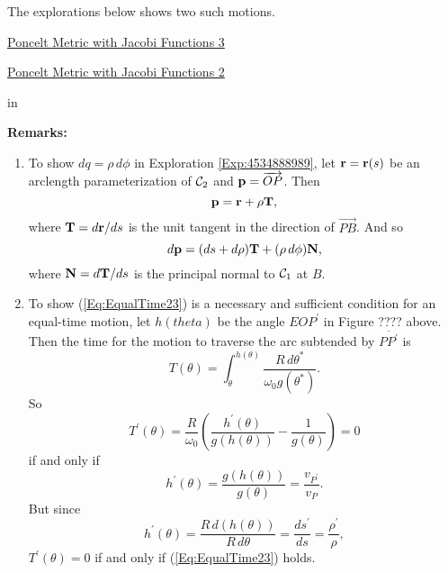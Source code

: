 \documentclass{ximera}
\newcommand{\pskip}{\vskip 0.1 in}
\begin{document}
The explorations below shows two such motions.

\begin{exploration}
\begin{onlineOnly}
    \begin{center}
\end{center}
\end{onlineOnly}

\href{https://www.desmos.com/calculator/l7oadgwyva}{Poncelt Metric with Jacobi Functions 3} %
\end{exploration}


\begin{exploration}
\begin{onlineOnly}
    \begin{center}
\end{center}
\end{onlineOnly}

\href{https://www.desmos.com/calculator/hm5zop04ob}{Poncelt Metric with Jacobi Functions 2}
\end{exploration}

\pskip

{\bf Remarks:}
\begin{enumerate}
\item To show $dq = \rho \, d\phi$ in Exploration \ref{Exp:4534888989}, let ${\bf r} = {\bf r}(s)$ be an arclength parameterization of ${\cal C}_2$ and ${\bf p} = \overrightarrow{OP}$. Then 
\[
  {\bf p} = {\bf r} + \rho {\bf T} ,
\]
where ${\bf T} = d{\bf r}/ds$ is the unit tangent in the direction of $\overrightarrow{PB}$. And so
\[
  d  {\bf p} = (ds + d\rho){\bf T} + (\rho \, d\phi) {\bf N} , 
\]
where ${\bf N} = d{\bf T}/ds$ is the principal normal to ${\cal C}_1$ at $B$.

\item To show (\ref{Eq:EqualTime23}) is a necessary and sufficient condition for an equal-time motion, let $h(theta)$ be the angle $EOP^\prime$ in Figure ???? above. Then the time for the motion to traverse the arc subtended by $\overline{PP^\prime}$ is
\[
   T(\theta) =  \int_\theta^{h(\theta)} \frac{R\, d\theta^*}{\omega_0 g(\theta^*)}.
\]
So
\[
     T^\prime(\theta) =\frac{R}{\omega_0}\left(   \frac{h^\prime(\theta)}{g(h(\theta))} - \frac{1}{g(\theta)}        \right) = 0
\]
if and only if
\[
    h^\prime(\theta) = \frac{g(h(\theta))}{g(\theta)} = \frac{v_{P^\prime}}{v_P}.
\]
But since 
\[
    h^\prime(\theta) =  \frac{R\,  d(h(\theta))}{R\, d\theta} =  \frac{ds^\prime}{ds} =  \frac{\rho^\prime}{\rho} , %
\]
$T^\prime(\theta)=0$ if and only if (\ref{Eq:EqualTime23}) holds.
\end{enumerate} 
\end{document}
